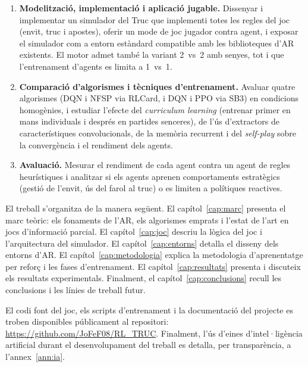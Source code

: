 \begin{enumerate}
  \item \textbf{Modelització, implementació i aplicació jugable.} Dissenyar i
    implementar un simulador del Truc que implementi totes les regles del joc
    (envit, truc i apostes), oferir un mode de joc jugador contra agent, i
    exposar el simulador com a entorn estàndard compatible amb les biblioteques
    d'\ac{AR} existents. El motor admet també la variant 2~vs~2 amb senyes,
    tot i que l'entrenament d'agents es limita a 1~vs~1.

  \item \textbf{Comparació d'algorismes i tècniques d'entrenament.} Avaluar quatre
    algorismes (\acf{DQN} i \acf{NFSP} via RLCard, i \ac{DQN} i \acf{PPO} via \acf{SB3})
    en condicions homogènies, i estudiar l'efecte del \emph{curriculum learning}
    (entrenar primer en mans individuals i després en partides senceres), de l'ús
    d'extractors de característiques convolucionals, de la memòria recurrent i
    del \emph{self-play} sobre la convergència i el rendiment dels agents.

  \item \textbf{Avaluació.} Mesurar el rendiment de cada agent contra un agent de
    regles heurístiques i analitzar si els agents aprenen comportaments estratègics
    (gestió de l'envit, ús del farol al truc) o es limiten a polítiques reactives.
\end{enumerate}

El treball s'organitza de la manera següent. El capítol~\ref{cap:marc} presenta el
marc teòric: els fonaments de l'\ac{AR}, els algorismes emprats i l'estat de l'art
en jocs d'informació parcial. El capítol~\ref{cap:joc} descriu la lògica del joc i
l'arquitectura del simulador. El capítol~\ref{cap:entorns} detalla el disseny dels
entorns d'\ac{AR}. El capítol~\ref{cap:metodologia} explica la metodologia
d'aprenentatge per reforç i les fases d'entrenament. El capítol~\ref{cap:resultats}
presenta i discuteix els resultats experimentals. Finalment, el capítol~\ref{cap:conclusions}
recull les conclusions i les línies de treball futur.

El codi font del joc, els scripts d'entrenament i la documentació del projecte
es troben disponibles públicament al repositori:
\url{https://github.com/JoFeF08/RL_TRUC}. Finalment, l'ús d'eines d'intel·ligència
artificial durant el desenvolupament del treball es detalla, per transparència, a
l'annex~\ref{ann:ia}.
